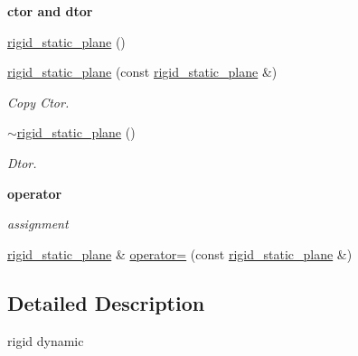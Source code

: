\begin{Indent}{\bf ctor and dtor}\par
{\em \label{_amgrp98fbd3e5ae66fcd014fb744fec76c58d}
 }\begin{DoxyCompactItemize}
\item 
\hyperlink{classnebula_1_1content_1_1actor_1_1renderer_1_1rigid__static__plane_a360474235f5a8576ff24eb1cda99190c}{rigid\_\-static\_\-plane} ()
\item 
\hyperlink{classnebula_1_1content_1_1actor_1_1renderer_1_1rigid__static__plane_ad08f17fad8acde766d44c6155647a70a}{rigid\_\-static\_\-plane} (const \hyperlink{classnebula_1_1content_1_1actor_1_1renderer_1_1rigid__static__plane}{rigid\_\-static\_\-plane} \&)
\begin{DoxyCompactList}\small\item\em Copy Ctor. \item\end{DoxyCompactList}\item 
\hyperlink{classnebula_1_1content_1_1actor_1_1renderer_1_1rigid__static__plane_a035f0d21aabf73b955ca2ce6ef56fb1e}{$\sim$rigid\_\-static\_\-plane} ()
\begin{DoxyCompactList}\small\item\em Dtor. \item\end{DoxyCompactList}\end{DoxyCompactItemize}
\end{Indent}
\begin{Indent}{\bf operator}\par
{\em \label{_amgrp4b583376b2767b923c3e1da60d10de59}
 assignment }\begin{DoxyCompactItemize}
\item 
\hyperlink{classnebula_1_1content_1_1actor_1_1renderer_1_1rigid__static__plane}{rigid\_\-static\_\-plane} \& \hyperlink{classnebula_1_1content_1_1actor_1_1renderer_1_1rigid__static__plane_a6038d69ad558ad5bfa9e52a7f01afd0b}{operator=} (const \hyperlink{classnebula_1_1content_1_1actor_1_1renderer_1_1rigid__static__plane}{rigid\_\-static\_\-plane} \&)
\end{DoxyCompactItemize}
\end{Indent}


\subsection{Detailed Description}
rigid dynamic 

